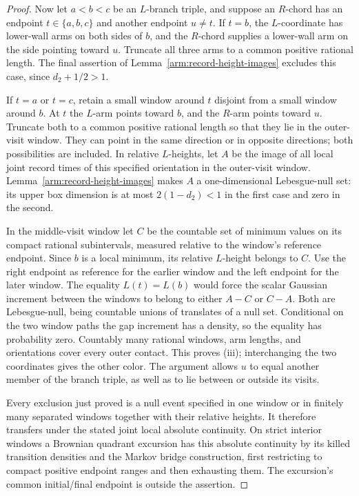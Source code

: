 \begin{proof}
Now let $a<b<c$ be an $L$-branch triple, and suppose an $R$-chord has
an endpoint $t\in\{a,b,c\}$ and another endpoint $u\ne t$.
If $t=b$, the $L$-coordinate has lower-wall arms on both sides of $b$,
and the $R$-chord supplies a lower-wall arm on the side pointing toward
$u$.  Truncate all three arms to a common positive rational length.
The final assertion of Lemma~\ref{arm:record-height-images} excludes
this case, since $d_2+1/2>1$.

If $t=a$ or $t=c$, retain a small window around $t$ disjoint from a
small window around $b$.  At $t$ the $L$-arm points toward $b$, and the
$R$-arm points toward $u$.  Truncate both to a common positive rational
length so that they lie in the outer-visit window.  They can point in
the same direction or in opposite directions; both possibilities are
included.  In relative $L$-heights, let $A$ be the image of all local
joint record times of this specified orientation in the outer-visit
window.  Lemma~\ref{arm:record-height-images} makes $A$ a
one-dimensional Lebesgue-null set: its upper box dimension is at most
$2(1-d_2)<1$ in the first case and zero in the second.

In the middle-visit window let $C$ be the countable set of minimum
values on its compact rational subintervals, measured relative to the
window's reference endpoint.  Since $b$ is a local minimum, its
relative $L$-height belongs to $C$.  Use the right endpoint as reference
for the earlier window and the left endpoint for the later window.
The equality $L(t)=L(b)$ would force the scalar Gaussian increment
between the windows to belong to either $A-C$ or $C-A$.
Both are Lebesgue-null, being countable unions of translates of a
null set.  Conditional on the two window paths the gap increment
has a density, so the equality has probability zero.  Countably many
rational windows, arm lengths, and orientations cover every outer
contact.  This proves (iii); interchanging the two coordinates gives
the other color.  The argument allows $u$ to equal another member of
the branch triple, as well as to lie between or outside its visits.

Every exclusion just proved is a null event specified in one window
or in finitely many separated windows together with their relative
heights.  It therefore transfers under the stated joint local absolute
continuity.  On strict interior windows a Brownian quadrant excursion
has this absolute continuity by its killed transition densities and
the Markov bridge construction, first restricting to compact positive
endpoint ranges and then exhausting them.  The excursion's common
initial/final endpoint is outside the assertion.
\end{proof}

